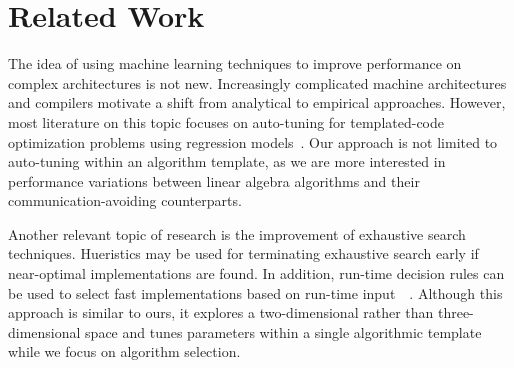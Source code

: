\section{Related Work}
\label{s:related}
The idea of using machine learning techniques to improve performance on complex architectures is not new.
Increasingly complicated machine architectures and compilers motivate a shift from analytical to empirical approaches.
However, most literature on this topic focuses on auto-tuning for templated-code optimization problems using regression models~\cite{bergstra2012machine}.
Our approach is not limited to auto-tuning within an algorithm template, as we are more interested in performance variations between linear algebra algorithms and their communication-avoiding counterparts.

Another relevant topic of research is the improvement of exhaustive search techniques.
Hueristics may be used for terminating exhaustive search early if near-optimal implementations are found.
In addition, run-time decision rules can be used to select fast implementations based on run-time input~\cite{vuduc2001statistical}~\cite{vuduc2004statistical}.
Although this approach is similar to ours, it explores a two-dimensional rather than three-dimensional space and tunes parameters within a single algorithmic template while we focus on algorithm selection.
